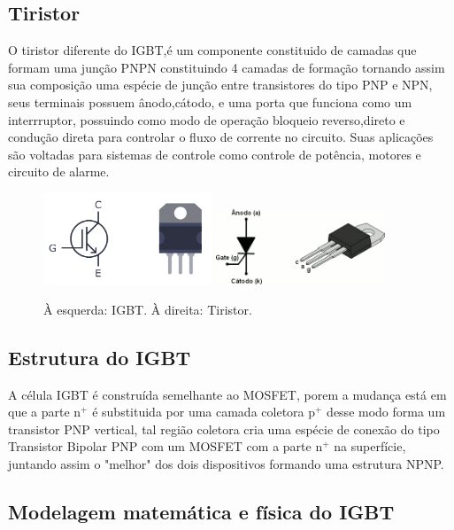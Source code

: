 \documentclass[12pt]{article}
\begin{document}
        \subsection{Tiristor}

        O tiristor diferente do IGBT,é um componente constituido de camadas que formam uma junção PNPN constituindo 4 camadas de formação tornando assim sua composição uma espécie de junção entre transistores do tipo PNP e NPN, seus terminais possuem ânodo,cátodo, e uma porta que funciona como um interrruptor, possuindo como modo de operação bloqueio reverso,direto e condução direta para controlar o fluxo de corrente no circuito. Suas aplicações são voltadas para sistemas de controle como controle de potência, motores e circuito de alarme.

        \begin{figure}[H]
            \centering
            \includegraphics[width=0.45\textwidth]{./images/IGBT.png}
            \includegraphics[width=0.45\textwidth]{./images/tiristor.png}
        \caption{À esquerda: IGBT. À direita: Tiristor.}
        \end{figure}
        \subsection{Estrutura do IGBT}

        A célula IGBT é construída semelhante ao MOSFET, porem a mudança está em que a parte n${^+}$ é substituida por uma camada coletora p${^+}$ desse modo forma um transistor PNP vertical, tal região coletora cria uma espécie de conexão do tipo Transistor Bipolar PNP com um MOSFET com a parte n${^+}$ na superfície, juntando assim o "melhor" dos dois dispositivos formando uma estrutura NPNP.

        \subsection{Modelagem matemática e física do IGBT}
\end{document}
